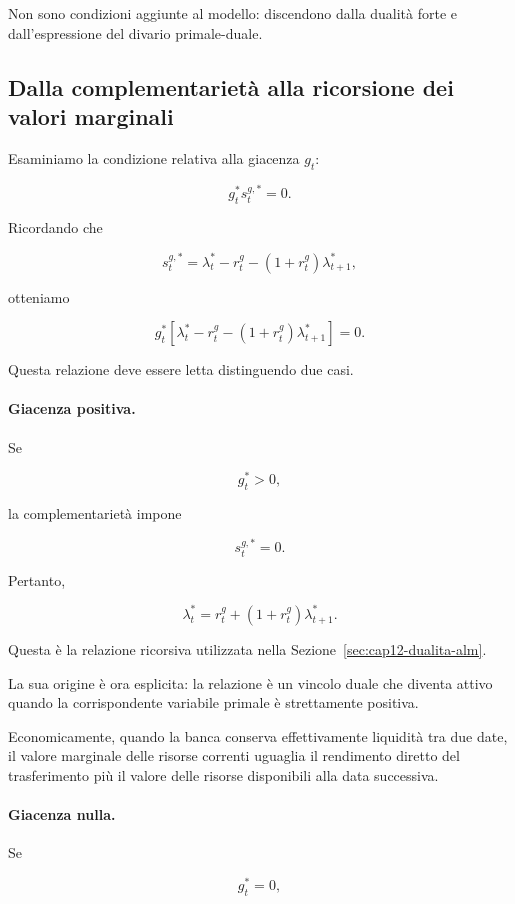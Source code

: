 Non sono condizioni aggiunte al modello:
discendono dalla dualit\`{a} forte
e dall'espressione del divario
primale-duale.

\subsection{Dalla complementariet\`{a}
alla ricorsione dei valori marginali}

Esaminiamo la condizione relativa
alla giacenza $g_t$:

\[
g_t^*s_t^{g,*}=0.
\]

Ricordando che

\[
s_t^{g,*}
=
\lambda_t^*-r_t^g
-(1+r_t^g)\lambda_{t+1}^*,
\]

\noindent otteniamo

\[
\boxed{
g_t^*
\left[
\lambda_t^*-r_t^g
-(1+r_t^g)\lambda_{t+1}^*
\right]=0.
}
\]

Questa relazione deve essere letta
distinguendo due casi.

\paragraph{Giacenza positiva.}

Se

\[
g_t^*>0,
\]

\noindent la complementariet\`{a} impone

\[
s_t^{g,*}=0.
\]

Pertanto,

\[
\boxed{
\lambda_t^*
=
r_t^g+(1+r_t^g)\lambda_{t+1}^*.
}
\]

Questa \`{e} la relazione ricorsiva
utilizzata nella Sezione~\ref{sec:cap12-dualita-alm}.

La sua origine \`{e} ora esplicita:
la relazione \`{e} un vincolo duale
che diventa attivo quando la
corrispondente variabile primale
\`{e} strettamente positiva.

Economicamente, quando la banca conserva
effettivamente liquidit\`{a} tra due date,
il valore marginale delle risorse correnti
uguaglia il rendimento diretto del
trasferimento pi\`{u} il valore delle
risorse disponibili alla data successiva.

\paragraph{Giacenza nulla.}

Se

\[
g_t^*=0,
\]


